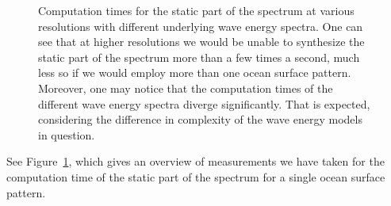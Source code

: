 \begin{figure}
\centering
\mydata
{}
\caption[Computation times for the static part of the spectrum at various
resolutions with different underlying wave energy spectra.]{
Computation times for the static part of the spectrum at various
resolutions with different underlying wave energy spectra.
One can see that at higher resolutions we would be unable to synthesize the
static part of the spectrum more than a few times a second, much less so if we
would employ more than one ocean surface pattern.
Moreover, one may notice that the computation times of the different wave
energy spectra diverge significantly. That is expected, considering
the difference in complexity of the wave energy models in question.
}
\label{fig:results:h0}
\end{figure}
%
See Figure~\ref{fig:results:h0}, which gives an overview of measurements we
have taken for the computation time of the static part of the spectrum for a
single ocean surface pattern.

